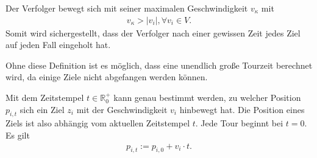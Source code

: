 \documentclass[german,version-2019-11]{uzl-thesis}
\begin{document}
\begin{definition}
Der Verfolger bewegt sich mit seiner maximalen Geschwindigkeit $v_{\kappa}$ mit
\begin{align*}
v_{\kappa} > |v_i|, \forall v_i\in V.
\end{align*}
Somit wird sichergestellt, dass der Verfolger nach einer gewissen Zeit jedes Ziel auf jeden Fall eingeholt hat.
\end{definition} \noindent
Ohne diese Definition ist es möglich, dass eine unendlich große Tourzeit berechnet wird, da einige Ziele nicht abgefangen werden können.

\begin{definition}
\label{def:UpdatedPos}
Mit dem Zeitstempel $t\in \mathbb{R}^+_0$ kann genau bestimmt werden, zu welcher Position $p_{i,t}$ sich ein Ziel $z_i$ mit der Geschwindigkeit $v_i$ hinbewegt hat. Die Position eines Ziels ist also abhängig vom aktuellen Zeitstempel $t$. Jede Tour beginnt bei $t=0$. \\
Es gilt
\begin{align*}
p_{i,t} := p_{i,0} + v_i\cdot t.
\end{align*} 
\end{definition}
\end{document}
